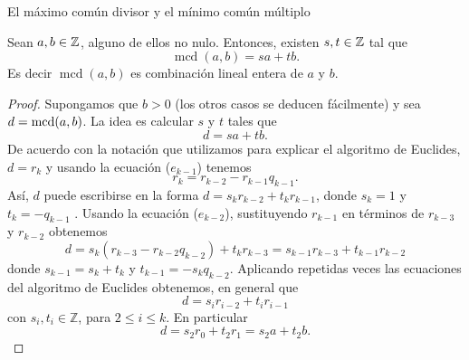 \begin{section}{El máximo común divisor y el mínimo común múltiplo}
\begin{teorema}\label{prop-d-comb-lin}
    Sean $a,b \in {\mathbb Z}$, alguno de ellos no nulo. Entonces,  existen $s, t \in {\mathbb Z}$ tal que 
    \begin{equation*}
        \operatorname{mcd}(a,b) = sa +tb.
    \end{equation*}
    Es decir $\operatorname{mcd}(a,b)$  es combinación lineal entera de $a$ y $b$.
\end{teorema}
\begin{proof}
Supongamos que $b>0$ (los otros casos se deducen fácilmente) y sea $d=\operatorname{mcd}(a,b)$. La idea es calcular $s$ y $t$ tales que
\begin{equation*}
    d= sa +tb.
\end{equation*}
De  acuerdo con la notación que utilizamos para explicar el algoritmo de Euclides, $d=r_{k}$ y usando la  ecuación ($e_{k-1}$) tenemos
$$
r_{k}=r_{k-2} -r_{k-1}q_{k-1}.
$$
Así, $d$ puede escribirse en la forma $ d = s_{k}r_{k-2} +t_{k}r_{k-1}$, donde $s_{k}=1$ y $t_{k}=-q_{k-1}$ . Usando la ecuación  ($e_{k-2}$), sustituyendo $r_{k-1}$ en términos de $r_{k-3}$ y $r_{k-2}$ obtenemos
$$
d= s_{k}(r_{k-3}-r_{k-2}q_{k-2}) + t_{k}r_{k-3} =  s_{k-1}r_{k-3} +t_{k-1}r_{k-2}
$$
donde $s_{k-1} = s_{k} + t_{k} $ y $t_{k-1}= -s_{k}q_{k-2}$.  Aplicando  repetidas veces las ecuaciones del algoritmo de Euclides obtenemos, en general que 
$$
d =  s_{i}r_{i-2} +t_{i}r_{i-1}
$$
con  $s_{i}, t_{i} \in \mathbb Z$, para $2 \le i \le k$. En particular 
$$
d =  s_{2}r_{0} +t_{2}r_{1} = s_{2}a +t_{2}b.
$$
\end{proof}




\end{section}
